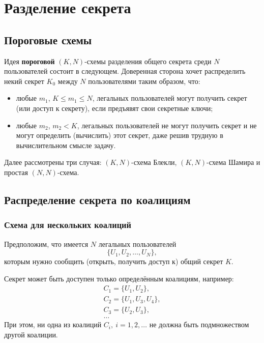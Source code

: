 \chapter{Разделение секрета}

\section{Пороговые схемы}

Идея \textbf{пороговой} $(K, N)$-схемы разделения общего секрета среди $N$ пользователей состоит в следующем. Доверенная сторона хочет распределить некий секрет $K_0$ между $N$ пользователями таким образом, что:
\begin{itemize}
    \item любые $m_1$, $K \le m_1 \le N$, легальных пользователей могут получить секрет (или доступ к секрету), если предъявят свои секретные ключи;
    \item любые $m_2$, $m_2 < K$, легальных пользователей не могут получить секрет и не могут определить (вычислить) этот секрет, даже решив трудную в вычислительном смысле задачу.
\end{itemize}

Далее рассмотрены три случая: $(K, N)$-схема Блекли, $(K, N)$-схема Шамира и простая $(N,N)$-схема.







\section{Распределение секрета по коалициям}

\subsection{Схема для нескольких коалиций}

Предположим, что имеется $N$ легальных пользователей
    \[ \{ U_1, U_2, \dots, U_N \}, \]
которым нужно сообщить (открыть, получить доступ к) общий секрет $K$.

Секрет может быть доступен только определённым коалициям, например:
\[ \begin{array}{l}
    C_1 = \{ U_1, U_2 \}, \\
    C_2 = \{ U_1, U_3, U_4 \}, \\
    C_3 = \{ U_2, U_3 \}, \\
    \dots
\end{array} \]
При этом, ни одна из коалиций $C_i, ~ i = 1, 2, \dots$ не должна быть подмножеством другой коалиции.


